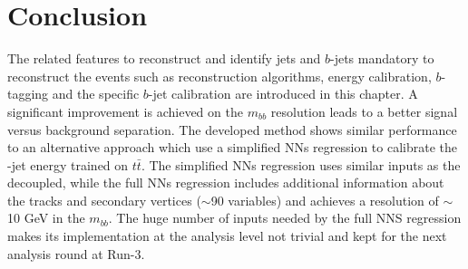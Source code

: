 \section{Conclusion}
\label{Jet:Conc}
The related features to reconstruct and identify jets and $b$-jets mandatory to reconstruct the \HHyybb events such as reconstruction algorithms, energy calibration, $b$-tagging and the specific $b$-jet calibration are introduced in this chapter. A significant improvement is achieved on the $m_{bb}$ resolution leads to a better signal versus background separation. The developed method shows similar performance to an alternative approach which use a simplified NNs regression to calibrate the \bq-jet energy trained on $t\bar{t}$. The simplified NNs regression uses similar inputs as the decoupled, while the full NNs regression includes additional information about the tracks and secondary vertices ($\sim$90 variables) and achieves a resolution of $\sim$10 GeV in the $m_{bb}$. The huge number of inputs needed by the full NNS regression makes its implementation at the analysis level not trivial and kept for the next analysis round at Run-3.